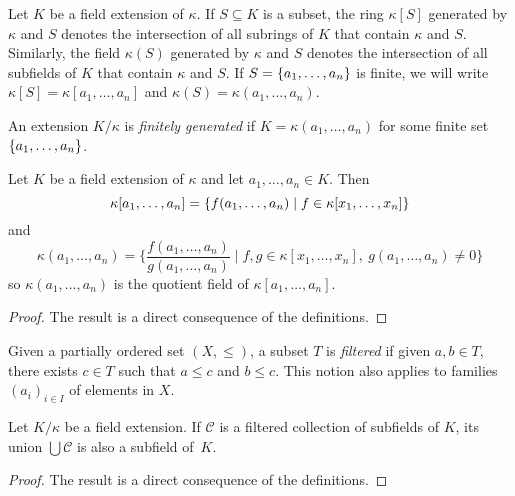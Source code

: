 \begin{ntns}
    Let\/ $K$ be a field extension of\/ $\kappa$. If\/ $S\subseteq K$ is a subset, the ring\/ $\kappa[S]$ generated by\/ $\kappa$ and\/ $S$ denotes the intersection of all subrings of\/ $K$ that contain\/ $\kappa$ and\/ $S$. Similarly, the field\/ $\kappa(S)$ generated by\/ $\kappa$ and\/ $S$ denotes the intersection of all subfields of\/ $K$ that contain\/ $\kappa$ and\/ $S$. If\/ $S=\{a_1, \dots, a_n\}$ is finite, we will write\/ $\kappa[S]=\kappa[a_1, \dots, a_n]$ and\/ $\kappa(S)=\kappa(a_1, \dots, a_n)$.
\end{ntns}

\begin{defn}
     An extension $K/\kappa$ is \textsl{finitely generated} if $K=\kappa(a_1,\dots,a_n)$ for some finite set $\{a_1,\dots,a_n\}$.
\end{defn}

\begin{prop}\label{prop:extension-generators}
    Let\/ $K$ be a field extension of\/ $\kappa$ and let\/ $a_1,\dots,a_n\in K$.
    Then
    $$
    \kappa[a_1,\dots,a_n]
        = \{f(a_1,\dots,a_n)\mid f\in\kappa[x_1,\dots,x_n]\}
    $$
    and
    $$
    \kappa(a_1,\dots,a_n)=\bigg\{\frac{f(a_1,\dots,a_n)}{g(a_1,\dots,a_n)}
        \mid f,g\in\kappa[x_1,\dots,x_n],\ g(a_1,\dots,a_n)\ne0\bigg\}
    $$
    so\/ $\kappa(a_1,\dots,a_n)$ is the quotient field of\/ $\kappa[a_1, \dots,a_n]$.
\end{prop}

\begin{proof}
    The result is a direct consequence of the definitions.
\end{proof}

\begin{defn}
    Given a partially ordered set $(X,\le)$, a subset $T$ is \textsl{filtered} if given $a,b\in T$, there exists $c\in T$ such that $a\le c$ and $b\le c$. This notion also applies to families $(a_i)_{i\in I}$ of elements in $X$.
\end{defn}

\begin{lem}
    Let\/ $K/\kappa$ be a field extension. If\/ $\mathcal C$ is a filtered collection of subfields of\/ $K$, its union\/ $\bigcup\mathcal C$ is also a subfield of\/~$K$.
\end{lem}

\begin{proof}
    The result is a direct consequence of the definitions.
\end{proof}

